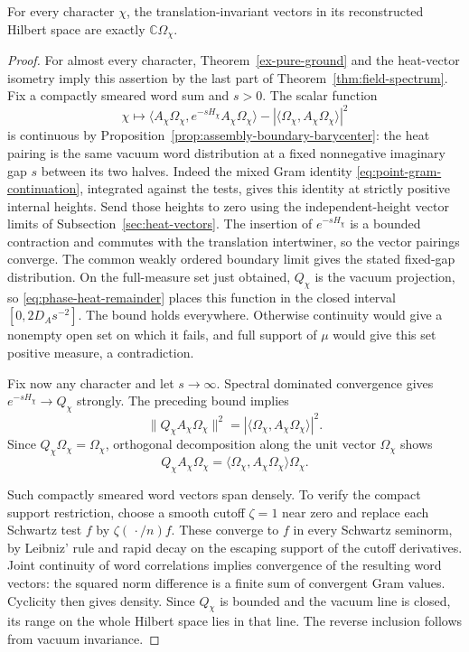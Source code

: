 \begin{theorem}
\label{thm:ex-every-character-vacuum}
For every character $\chi$, the translation-invariant vectors in its
reconstructed Hilbert space are exactly $\mathbb C\Omega_\chi$.
\end{theorem}
\begin{proof}
For almost every character, Theorem~\ref{ex-pure-ground} and the
heat-vector isometry imply this assertion by the last part of
Theorem~\ref{thm:field-spectrum}. Fix a compactly smeared word sum and
$s>0$. The scalar function
\[
 \chi\longmapsto
 \langle A_\chi\Omega_\chi,e^{-sH_\chi}A_\chi\Omega_\chi\rangle
       -|\langle\Omega_\chi,A_\chi\Omega_\chi\rangle|^2
\]
is continuous by Proposition~\ref{prop:assembly-boundary-barycenter}:
the heat pairing is the same vacuum word distribution at a fixed
nonnegative imaginary gap $s$ between its two halves. Indeed the
mixed Gram identity \eqref{eq:point-gram-continuation}, integrated
against the tests, gives this identity at strictly positive internal
heights. Send those heights to zero using the independent-height
vector limits of Subsection~\ref{sec:heat-vectors}. The insertion of
$e^{-sH_\chi}$ is a bounded contraction and commutes with the
translation intertwiner, so the vector pairings converge. The common
weakly ordered boundary limit gives the stated fixed-gap distribution. On the
full-measure set just obtained, $Q_\chi$ is the vacuum projection, so
\eqref{eq:phase-heat-remainder} places this function in the closed
interval $[0,2D_As^{-2}]$. The bound holds everywhere. Otherwise
continuity would give a nonempty open set on which it fails, and full
support of $\mu$ would give this set positive measure, a contradiction.

Fix now any character and let $s\to\infty$. Spectral dominated
convergence gives $e^{-sH_\chi}\to Q_\chi$ strongly. The preceding
bound implies
\[
 \|Q_\chi A_\chi\Omega_\chi\|^2
       =|\langle\Omega_\chi,A_\chi\Omega_\chi\rangle|^2.
\]
Since $Q_\chi\Omega_\chi=\Omega_\chi$, orthogonal decomposition along
the unit vector $\Omega_\chi$ shows
\[
 Q_\chi A_\chi\Omega_\chi
=\langle\Omega_\chi,A_\chi\Omega_\chi\rangle\Omega_\chi.
\]

Such compactly smeared word vectors span densely. To verify the compact
support restriction, choose a smooth cutoff $\zeta=1$ near zero and
replace each Schwartz test $f$ by $\zeta(\,\cdot/n)f$. These converge
to $f$ in every Schwartz seminorm, by Leibniz' rule and rapid decay on
the escaping support of the cutoff derivatives. Joint continuity of
word correlations implies convergence of the resulting word vectors:
the squared norm difference is a finite sum of convergent Gram values.
Cyclicity then gives density. Since $Q_\chi$ is bounded and the vacuum
line is closed, its range on the whole Hilbert space lies in that line.
The reverse inclusion follows from vacuum invariance.
\end{proof}
